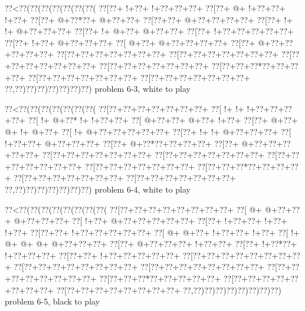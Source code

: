 \vbox{\vbox{\goo
\0??<\0??(\0??(\0??(\0??(\0??(\0??(\0??(
\0??[\0??+\- !+\0??+\- !+\0??+\0??+\0??+
\0??[\0??+\- @+\- !+\0??+\0??+\- !+\0??+
\0??[\0??+\- @+\0??*\0??+\- @+\0??+\0??+
\0??[\0??+\0??+\- @+\0??+\0??+\0??+\0??+
\0??[\0??+\- !+\- !+\- @+\0??+\0??+\0??+
\0??[\0??+\- !+\- @+\0??+\- @+\0??+\0??+
\0??[\0??+\- !+\0??+\0??+\0??+\0??+\0??+
\0??[\0??+\- !+\0??+\- @+\0??+\0??+\0??+
\0??[\- @+\0??+\- @+\0??+\0??+\0??+\0??+
\0??[\0??+\- @+\0??+\0??+\0??+\0??+\0??+
\0??[\0??+\0??+\0??+\0??+\0??+\0??+\0??+
\0??[\0??+\0??+\0??+\0??+\0??+\0??+\0??+
\0??[\0??+\0??+\0??+\0??+\0??+\0??+\0??+
\0??[\0??+\0??+\0??+\0??+\0??+\0??+\0??+
\0??[\0??+\0??+\0??*\0??+\0??+\0??+\0??+
\0??[\0??+\0??+\0??+\0??+\0??+\0??+\0??+
\0??[\0??+\0??+\0??+\0??+\0??+\0??+\0??+
\0??,\0??)\0??)\0??)\0??)\0??)\0??)\0??)
}
\hfil problem 6-3, white to play\hfil\break
}

\vbox{\vbox{\goo
\0??<\0??(\0??(\0??(\0??(\0??(\0??(\0??(
\0??[\0??+\0??+\0??+\0??+\0??+\0??+\0??+
\0??[\- !+\- !+\- !+\0??+\0??+\0??+\0??+
\0??[\- !+\- @+\0??*\- !+\- !+\0??+\0??+
\0??[\- @+\0??+\0??+\- @+\0??+\- !+\0??+
\0??[\0??+\- @+\0??+\- @+\- !+\- @+\0??+
\0??[\- !+\- @+\0??+\0??+\0??+\0??+\0??+
\0??[\0??+\- !+\- !+\- @+\0??+\0??+\0??+
\0??[\- !+\0??+\0??+\- @+\0??+\0??+\0??+
\0??[\0??+\- @+\0??*\0??+\0??+\0??+\0??+
\0??[\0??+\- @+\0??+\0??+\0??+\0??+\0??+
\0??[\0??+\0??+\0??+\0??+\0??+\0??+\0??+
\0??[\0??+\0??+\0??+\0??+\0??+\0??+\0??+
\0??[\0??+\0??+\0??+\0??+\0??+\0??+\0??+
\0??[\0??+\0??+\0??+\0??+\0??+\0??+\0??+
\0??[\0??+\0??+\0??*\0??+\0??+\0??+\0??+
\0??[\0??+\0??+\0??+\0??+\0??+\0??+\0??+
\0??[\0??+\0??+\0??+\0??+\0??+\0??+\0??+
\0??,\0??)\0??)\0??)\0??)\0??)\0??)\0??)
}
\hfil problem 6-4, white to play\hfil\break
}

\vbox{\vbox{\goo
\0??<\0??(\0??(\0??(\0??(\0??(\0??(\0??(\0??(
\0??[\0??+\0??+\0??+\0??+\0??+\0??+\0??+\0??+
\0??[\- @+\- @+\0??+\0??+\- @+\0??+\0??+\0??+
\0??[\- !+\0??+\- @+\0??+\0??+\0??+\0??+\0??+
\0??[\0??+\- !+\0??+\0??+\- !+\0??+\- !+\0??+
\0??[\0??+\0??+\- !+\0??+\0??+\0??+\0??+\0??+
\0??[\- @+\- @+\0??+\- !+\0??+\0??+\- !+\0??+
\0??[\- !+\- @+\- @+\- @+\- @+\0??+\0??+\0??+
\0??[\0??+\- @+\0??+\0??+\0??+\- !+\0??+\0??+
\0??[\0??+\- !+\0??*\0??+\- !+\0??+\0??+\0??+
\0??[\0??+\0??+\- !+\0??+\0??+\0??+\0??+\0??+
\0??[\0??+\0??+\0??+\0??+\0??+\0??+\0??+\0??+
\0??[\0??+\0??+\0??+\0??+\0??+\0??+\0??+\0??+
\0??[\0??+\0??+\0??+\0??+\0??+\0??+\0??+\0??+
\0??[\0??+\0??+\0??+\0??+\0??+\0??+\0??+\0??+
\0??[\0??+\0??+\0??*\0??+\0??+\0??+\0??+\0??+
\0??[\0??+\0??+\0??+\0??+\0??+\0??+\0??+\0??+
\0??[\0??+\0??+\0??+\0??+\0??+\0??+\0??+\0??+
\0??,\0??)\0??)\0??)\0??)\0??)\0??)\0??)\0??)
}
\hfil problem 6-5, black to play\hfil\break
}

